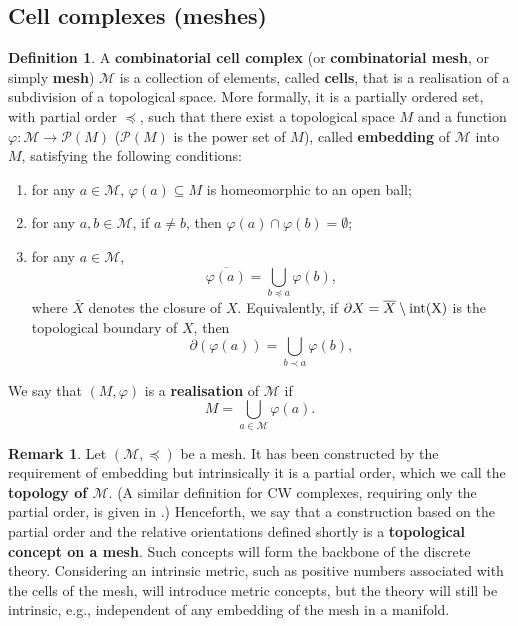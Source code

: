 \documentclass{elsarticle}
\theoremstyle{definition}
\newtheorem{definition}[theorem]{Definition}
\newtheorem{remark}[theorem]{Remark}
\newcommand{\newterm}[1]{\textbf{#1}}
\begin{document}
\subsection{Cell complexes (meshes)}
\label{sec:combinatorial/meshes}
\begin{definition}
  A \newterm{combinatorial cell complex} (or \newterm{combinatorial mesh}, or simply \newterm{mesh}) $\mathcal{M}$ is a collection of elements, called \newterm{cells}, that is a realisation of a subdivision of a topological space.
  More formally, it is a partially ordered set, with partial order $\preceq$, such that there exist a topological space $M$ and a function
  $\varphi \colon \mathcal{M} \to \mathcal{P}(M)$
  ($\mathcal{P}(M)$ is the power set of $M$),
  called \newterm{embedding} of $\mathcal{M}$ into $M$, satisfying the following conditions:
  \begin{enumerate}
    \item
      for any $a \in \mathcal{M}$, $\varphi(a) \subseteq M$ is homeomorphic to an open ball;
    \item
      for any $a, b \in \mathcal{M}$, if $a \neq b$, then $\varphi(a) \cap \varphi(b) = \emptyset$;
    \item
      for any $a \in \mathcal{M}$,
      \begin{equation}
        \overline{\varphi(a)} = \bigcup_{b \preceq a} \varphi(b),
      \end{equation}
      where $\overline{X}$ denotes the closure of $X$.
      Equivalently, if $\partial X = \overline{X} \setminus {\rm int(X)}$ is the topological boundary of $X$, then
      \begin{equation}
        \partial(\varphi(a)) = \bigcup_{b \prec a} \varphi(b),
      \end{equation}
  \end{enumerate}
  We say that $(M, \varphi)$ is a \newterm{realisation} of $\mathcal{M}$ if
  \begin{equation}
    M = \bigcup_{a \in \mathcal{M}} \varphi(a).
  \end{equation}
\end{definition}
\begin{remark}
  Let $(\mathcal{M}, \preceq)$ be a mesh.
  It has been constructed by the requirement of embedding but intrinsically it is a partial order, which we call the \newterm{topology of $\mathcal{M}$}.
  (A similar definition for CW complexes, requiring only the partial order, is given in \cite{bjorner1984posets}.)
  Henceforth, we say that a construction based on the partial order and the relative orientations defined shortly is a \newterm{topological concept on a mesh}.
  Such concepts will form the backbone of the discrete theory.
  Considering an intrinsic metric, such as positive numbers associated with the cells of the mesh, will introduce metric concepts, but the theory will still be intrinsic, e.g., independent of any embedding of the mesh in a manifold.
\end{remark}
\end{document}
